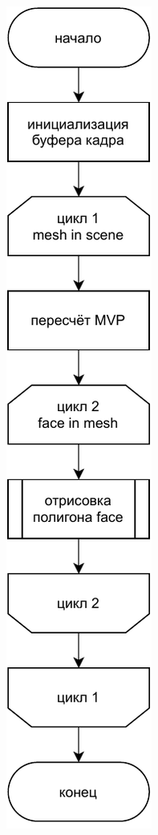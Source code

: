 \begin{figure}
	\centering
	\includegraphics[width=\linewidth,height=\textheight,keepaspectratio]{diagrams/fast.pdf}
\end{figure}

